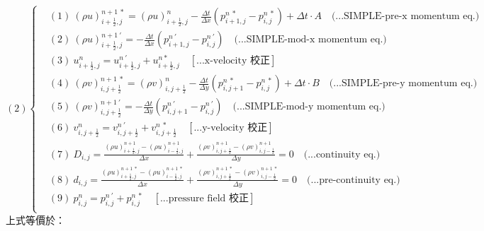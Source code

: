 \documentclass[12pt]{article}
\begin{document}
\begin{equation}
(2)
\left\{
\begin{aligned}
    &(1)\ (\rho u)_{i+\frac{1}{2},j}^{n+1\ *} = (\rho u)_{i+\frac{1}{2},j}^{n} - \frac{\Delta t}{\Delta x}(p_{i+1,j}^{n\ *} - p_{i,j}^{n\ *}) + \Delta t \cdot A \quad \text{(...SIMPLE-pre-x momentum eq.)}\\[1.5ex]
    &(2)\ (\rho u)_{i+\frac{1}{2},j}^{n+1\ \prime} = - \frac{\Delta t}{\Delta x}(p_{i+1,j}^{n\ \prime} - p_{i,j}^{n\ \prime})  \quad \text{(...SIMPLE-mod-x momentum eq.)}\\[1.5ex]
    &(3)\ u_{i+\frac{1}{2},j}^{n} = u_{i+\frac{1}{2},j}^{n\ '} + u_{i+\frac{1}{2},j}^{n *}  \quad \left[\text{...x-velocity 校正}\right]\\[1.5ex]
    &(4)\ (\rho v)_{i,j+\frac{1}{2}}^{n+1\ *} = (\rho v)_{i,j+\frac{1}{2}}^{n} - \frac{\Delta t}{\Delta y}(p_{i,j+1}^{n\ *} - p_{i,j}^{n\ *}) + \Delta t \cdot B  \quad \text{(...SIMPLE-pre-y momentum eq.)}\\[1.5ex]
    &(5)\ (\rho v)_{i,j+\frac{1}{2}}^{n+1\ \prime} =  - \frac{\Delta t}{\Delta y}(p_{i,j+1}^{n\ \prime} - p_{i,j}^{n\ \prime}) \quad \text{(...SIMPLE-mod-y momentum eq.)}\\[1.5ex]
    &(6)\ v_{i,j+\frac{1}{2}}^{n} = v_{i,j+\frac{1}{2}}^{n\ \prime} + v_{i,j+\frac{1}{2}}^{n\ *} \quad \left[\text{...y-velocity 校正}\right]\\[1.5ex]
    &(7)\ D_{i,j} = \frac{(\rho u)_{i+\frac{1}{2},j}^{n+1} - (\rho u)_{i-\frac{1}{2},j}^{n+1}}{\Delta x} + \frac{(\rho v)_{i,j+\frac{1}{2}}^{n+1} - (\rho v)_{i,j-\frac{1}{2}}^{n+1}}{\Delta y} = 0 \quad \text{(...continuity eq.)}\\[1.5ex]
    &(8)\ d_{i,j} = \frac{(\rho u)_{i+\frac{1}{2},j}^{n+1\ *} - (\rho u)_{i-\frac{1}{2},j}^{n+1\ *}}{\Delta x} + \frac{(\rho v)_{i,j+\frac{1}{2}}^{n+1\ *} - (\rho v)_{i,j-\frac{1}{2}}^{n+1\ *}}{\Delta y} = 0 \quad \text{(...pre-continuity eq.)}\\[1.5ex]
    &(9)\ p_{i,j}^{n} = p_{i,j}^{n\ \prime} + p_{i,j}^{n\ *} \quad\left[\text{...pressure field 校正}\right]\\[1.5ex]
\end{aligned}
\right.
\end{equation}
\noindent 上式等價於：\\
\end{document}
